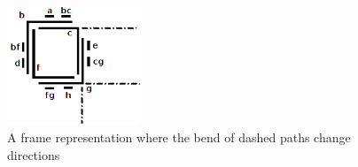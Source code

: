 \begin{figure}[htb]	
\center%
\includegraphics[width=4cm]{./img/outraRepresentacaoFrame3.png}
\caption{A frame representation where the bend of dashed paths change directions}
\label{fig:outraRepresentacaoFrame}
\end{figure}